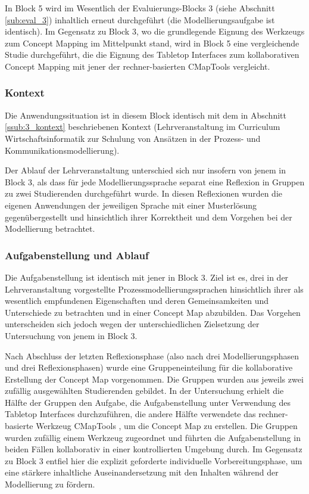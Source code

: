 In Block 5 wird im Wesentlich der Evaluierungs-Blocks 3 (siehe Abschnitt \ref{sub:eval_3}) inhaltlich erneut durchgeführt (die Modellierungsaufgabe ist identisch). Im Gegensatz zu Block 3, wo die grundlegende Eignung des Werkzeugs zum Concept Mapping im Mittelpunkt stand, wird in Block 5 eine vergleichende Studie durchgeführt, die die Eignung des Tabletop Interfaces zum kollaborativen Concept Mapping mit jener der rechner-basierten CMapTools \citep{Canas04} vergleicht.

\subsubsection{Kontext} %
\label{ssub:5_kontext}

Die Anwendungssituation ist in diesem Block identisch mit dem in Abschnitt \ref{ssub:3_kontext} beschriebenen Kontext (Lehrveranstaltung im Curriculum Wirtschaftsinformatik zur Schulung von Ansätzen in der Prozess- und Kommunikationsmodellierung).

Der Ablauf der Lehrveranstaltung unterschied sich nur insofern von jenem in Block 3, als dass für jede Modellierungssprache separat eine Reflexion in Gruppen zu zwei Studierenden durchgeführt wurde. In diesen Reflexionen wurden die eigenen Anwendungen der jeweiligen Sprache mit einer Musterlösung gegenübergestellt und hinsichtlich ihrer Korrektheit und dem Vorgehen bei der Modellierung betrachtet.


\subsubsection{Aufgabenstellung und Ablauf} %
\label{ssub:5_aufgabenstellung}

Die Aufgabenstellung ist identisch mit jener in Block 3. Ziel ist es, drei in der Lehrveranstaltung vorgestellte Prozessmodellierungssprachen hinsichtlich ihrer als wesentlich empfundenen Eigenschaften und deren Gemeinsamkeiten und Unterschiede zu betrachten und in einer Concept Map abzubilden. Das Vorgehen unterscheiden sich jedoch wegen der unterschiedlichen Zielsetzung der Untersuchung von jenem in Block 3.

Nach Abschluss der letzten Reflexionsphase (also nach drei Modellierungsphasen und drei Reflexionsphasen) wurde eine Gruppeneinteilung für die kollaborative Erstellung der Concept Map vorgenommen. Die Gruppen wurden aus jeweils zwei zufällig ausgewählten Studierenden gebildet. In der Untersuchung erhielt die Hälfte der Gruppen den Aufgabe, die Aufgabenstellung unter Verwendung des Tabletop Interfaces durchzuführen, die andere Hälfte verwendete das rechner-basierte Werkzeug CMapTools \citep{Canas04}, um die Concept Map zu erstellen. Die Gruppen wurden zufällig einem Werkzeug zugeordnet und führten die Aufgabenstellung in beiden Fällen kollaborativ in einer kontrollierten Umgebung durch. Im Gegensatz zu Block 3 entfiel hier die explizit geforderte individuelle Vorbereitungsphase, um eine stärkere inhaltliche Auseinandersetzung mit den Inhalten während der Modellierung zu fördern. 

